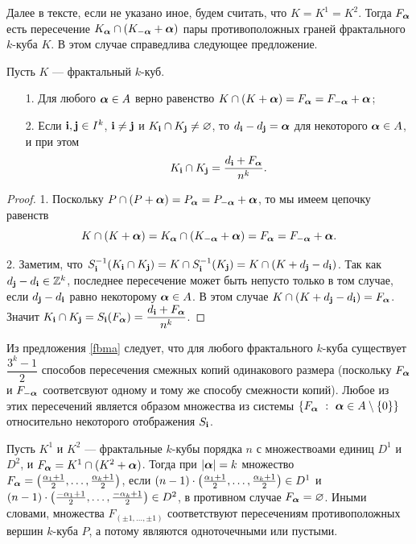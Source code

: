 Далее в тексте, если не указано иное, будем считать, что $K=K^1=K^2$.
Тогда $F_{\bm{\alpha}}$ есть пересечение $K_{\bm{\alpha}}\cap(K_{-{\bm{\alpha}}}+{\bm{\alpha}})$ пары противоположных граней фрактального $k$-куба $K$.
В этом случае справедлива следующее предложение.

\begin{proposition}\label{fbma}
Пусть $K$ --- фрактальный $k$-куб.
\begin{itemize}[nolistsep]
\item[1.] Для любого ${\bm{\alpha}}\in A$ верно равенство $K\cap(K+{\bm{\alpha}})=F_{\bm{\alpha}}=F_{-{\bm{\alpha}}}+{\bm{\alpha}} $;
\item[2.] Если ${\bf{i}},{\bf{j}} \in I^k$, ${\bf{i}}\neq {\bf{j}}$ и $K_{\bf{i}}\cap K_{\bf{j}}\neq\varnothing$, то $d_{\bf{i}}-d_{\bf{j}}={\bm{\alpha}}$ для некоторого ${\bm{\alpha}}\in A$, и при этом 
$$K_{\bf{i}}\cap K_{\bf{j}}=\dfrac{d_{\bf{i}}+F_{\bm{\alpha}}}{n^k}.$$
\end{itemize}
\end{proposition}

\begin{proof}
1. Поскольку $P\cap (P+{\bm{\alpha}})=P_{\bm{\alpha}}=P_{-{\bm{\alpha}}}+{\bm{\alpha}}$, то мы имеем цепочку равенств 
$$K\cap(K+{\bm{\alpha}})= K_{\bm{\alpha}}\cap (K_{-{\bm{\alpha}}}+{\bm{\alpha}})=F_{\bm{\alpha}}=F_{-{\bm{\alpha}}}+{\bm{\alpha}}.$$

2. Заметим, что $S_{\bf{i}}^{-1}(K_{\bf{i}}\cap K_{\bf{j}})=K\cap S_{\bf{i}}^{-1}(K_{\bf{j}})=K\cap (K+d_{\bf{j}}-d_{\bf{i}})$. 
Так как $d_{\bf{j}}-d_{\bf{i}}\in\mathbb{Z}^k$, последнее пересечение может быть непусто только в том случае, если $d_{\bf{j}}-d_{\bf{i}}$ равно некоторому ${\bm{\alpha}}\in A$. 
В этом случае $K\cap(K+d_{\bf{j}}-d_{\bf{i}})=F_{\bm{\alpha}}$.
Значит $K_{\bf{i}}\cap K_{\bf{j}}= S_{\bf{i}}(F_{\bm{\alpha}})= \dfrac{d_{\bf{i}}+F_{\bm{\alpha}}}{n^k}$. 
\end{proof}

Из предложения \ref{fbma} следует, что для любого фрактального $k$-куба существует $\dfrac{3^k-1}{2}$ способов пересечения смежных копий одинакового размера (поскольку $F_{\bm{\alpha}}$ и $F_{-{\bm{\alpha}}}$ соответсвуют одному и тому же способу смежности копий). 
Любое из этих пересечений является образом множества из системы $\{F_{\bm{\alpha}}\ :\ {\bm{\alpha}}\in A\setminus\{0\}\}$ относительно некоторого отображения $S_{\bf{i}}$. 

Пусть $K^1$ и $K^2$ --- фрактальные $k$-кубы порядка $n$ с множествоами единиц $D^1$ и $D^2$, и $F_{{\bm{\alpha}}}=K^1\cap(K^2+{\bm{\alpha}})$.
Тогда при $|{\bm{\alpha}}|=k$ множество $F_{{\bm{\alpha}}}=\left(\frac{\alpha_1+1}{2},\ldots,\frac{\alpha_k+1}{2}\right)$, если $(n-1)\cdot\left(\frac{\alpha_1+1}{2},\ldots,\frac{\alpha_k+1}{2}\right)\in D^1$ и $(n-1)\cdot\left(\frac{-\alpha_1+1}{2},\ldots,\frac{-\alpha_k+1}{2}\right)\in D^2$, в противном случае $F_{{\bm{\alpha}}}=\varnothing$. 
Иными словами, множества $F_{(\pm1,\ldots,\pm1)}$ соответствуют пересечениям противоположных вершин $k$-куба $P$, а потому являются одноточечными или пустыми.

